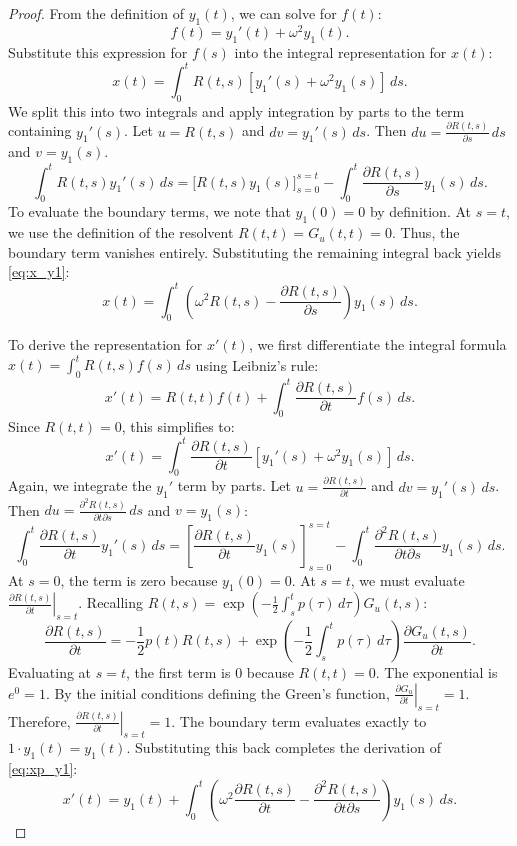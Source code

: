 \documentclass[10pt,reqno]{amsart}
\theoremstyle{definition}
\begin{document}
	\begin{proof}
		From the definition of $y_1(t)$, we can solve for $f(t)$:
		\[ f(t) = y_1'(t) + \omega^2 y_1(t). \]
		Substitute this expression for $f(s)$ into the integral representation for $x(t)$:
		\[ x(t) = \int_0^t R(t, s) \left[ y_1'(s) + \omega^2 y_1(s) \right] \, ds. \]
		We split this into two integrals and apply integration by parts to the term containing $y_1'(s)$. Let $u = R(t, s)$ and $dv = y_1'(s) \, ds$. Then $du = \frac{\partial R(t, s)}{\partial s} \, ds$ and $v = y_1(s)$.
		\[ \int_0^t R(t, s) y_1'(s) \, ds = \Big[ R(t, s) y_1(s) \Big]_{s=0}^{s=t} - \int_0^t \frac{\partial R(t, s)}{\partial s} y_1(s) \, ds. \]
		To evaluate the boundary terms, we note that $y_1(0) = 0$ by definition. At $s = t$, we use the definition of the resolvent $R(t, t) = G_u(t, t) = 0$. Thus, the boundary term vanishes entirely. Substituting the remaining integral back yields \eqref{eq:x_y1}:
		\[ x(t) = \int_0^t \left( \omega^2 R(t, s) - \frac{\partial R(t, s)}{\partial s} \right) y_1(s) \, ds. \]
		
		To derive the representation for $x'(t)$, we first differentiate the integral formula $x(t) = \int_0^t R(t, s)f(s) \, ds$ using Leibniz's rule:
		\[ x'(t) = R(t, t)f(t) + \int_0^t \frac{\partial R(t, s)}{\partial t} f(s) \, ds. \]
		Since $R(t, t) = 0$, this simplifies to:
		\[ x'(t) = \int_0^t \frac{\partial R(t, s)}{\partial t} \left[ y_1'(s) + \omega^2 y_1(s) \right] \, ds. \]
		Again, we integrate the $y_1'$ term by parts. Let $u = \frac{\partial R(t, s)}{\partial t}$ and $dv = y_1'(s) \, ds$. Then $du = \frac{\partial^2 R(t, s)}{\partial t \partial s} \, ds$ and $v = y_1(s)$:
		\[ \int_0^t \frac{\partial R(t, s)}{\partial t} y_1'(s) \, ds = \left[ \frac{\partial R(t, s)}{\partial t} y_1(s) \right]_{s=0}^{s=t} - \int_0^t \frac{\partial^2 R(t, s)}{\partial t \partial s} y_1(s) \, ds. \]
		At $s=0$, the term is zero because $y_1(0) = 0$. At $s=t$, we must evaluate $\left. \frac{\partial R(t, s)}{\partial t} \right|_{s=t}$. Recalling $R(t, s) = \exp\left(-\frac{1}{2}\int_s^t p(\tau) \, d\tau\right) G_u(t, s)$:
		\[ \frac{\partial R(t, s)}{\partial t} = -\frac{1}{2}p(t) R(t, s) + \exp\left(-\frac{1}{2}\int_s^t p(\tau) \, d\tau\right) \frac{\partial G_u(t, s)}{\partial t}. \]
		Evaluating at $s=t$, the first term is $0$ because $R(t, t) = 0$. The exponential is $e^0 = 1$. By the initial conditions defining the Green's function, $\left. \frac{\partial G_u}{\partial t} \right|_{s=t} = 1$. Therefore, $\left. \frac{\partial R(t, s)}{\partial t} \right|_{s=t} = 1$.
		The boundary term evaluates exactly to $1 \cdot y_1(t) = y_1(t)$. Substituting this back completes the derivation of \eqref{eq:xp_y1}:
		\[ x'(t) = y_1(t) + \int_0^t \left( \omega^2 \frac{\partial R(t, s)}{\partial t} - \frac{\partial^2 R(t, s)}{\partial t \partial s} \right) y_1(s) \, ds. \]
	\end{proof}
	
\end{document}
